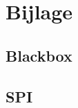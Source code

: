 \documentclass[oneside,dutch]{tudelft-report}
\begin{document}
\chapter{Bijlage}
\section{Blackbox}
\label{Blackbox entity}
 
\label{Blackbox behaviour}

\label{Stream entity}

\label{Stream behaviour}


\section{SPI}
\end{document}
